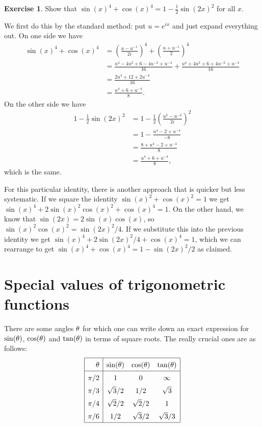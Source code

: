 \documentclass[a4paper]{book}
\theoremstyle{definition}
\newtheorem{exercise}[theorem]{Exercise}
\renewenvironment{solution}{\SolutionInline}{\endSolutionInline}
\begin{document}
\begin{exercise}
 Show that $\sin(x)^4+\cos(x)^4=1-\frac{1}{2}\sin(2x)^2$ for all $x$.
\end{exercise}
\begin{solution}
 We first do this by the standard method: put $u=e^{ix}$ and just
 expand everything out.  On one side we have
 \begin{align*}
  \sin(x)^4+\cos(x)^4 &= 
   \left(\frac{u-u^{-1}}{2i}\right)^4 + 
   \left(\frac{u+u^{-1}}{2}\right)^4  \\
  &= \frac{u^4-4u^2+6-4u^{-2}+u^{-4}}{16} + 
     \frac{u^4+4u^2+6+4u^{-2}+u^{-4}}{16} \\
  &= \frac{2u^4+12+2u^{-4}}{16} \\
  &= \frac{u^4+6+u^{-4}}{8}. 
 \end{align*}
 On the other side we have
 \begin{align*}
  1-\frac{1}{2}\sin(2x)^2 
   &= 1 - \frac{1}{2}\left(\frac{u^2-u^{-2}}{2i}\right)^2 \\
   &= 1 - \frac{u^4-2+u^{-4}}{-8} \\
   &= \frac{8 + u^4 - 2 + u^{-4}}{8} \\
   &= \frac{u^4+6+u^{-4}}{8},
 \end{align*}
 which is the same.

 For this particular identity, there is another approach that is
 quicker but less systematic.  If we square the identity
 $\sin(x)^2+\cos(x)^2=1$ we get
 $\sin(x)^4+2\sin(x)^2\cos(x)^2+\cos(x)^4=1$.  On the other hand, we
 know that $\sin(2x)=2\sin(x)\cos(x)$, so
 $\sin(x)^2\cos(x)^2=\sin(2x)^2/4$.  If we substitute this into the
 previous identity we get $\sin(x)^4+2\sin(2x)^2/4+\cos(x)^4=1$, which
 we can rearrange to get $\sin(x)^4+\cos(x)^4=1-\sin(2x)^2/2$ as
 claimed. 
\end{solution}

\section{Special values of trigonometric functions}
\label{sec-values}

There are some angles $\theta$ for which one can write down an exact
expression for $\sin(\theta)$, $\cos(\theta)$ and $\tan(\theta)$ in terms of
square roots.  The really crucial ones are as follows:
\[ \renewcommand{\arraystretch}{1.5}
   \begin{array}{|r|ccc|}
    \hline
    \tht  & \sin(\tht)  & \cos(\tht) & \tan(\tht) \\
    \hline
    \pi/2 & 1           & 0           & \infty    \\
    \pi/3 & \rr/2       & 1/2         & \rr       \\
    \pi/4 & \rt/2       & \rt/2       & 1         \\
    \pi/6 & 1/2         & \rr/2       & \rr/3     \\
    \hline
  \end{array}
\]
\end{document}
